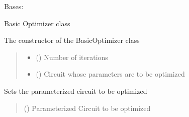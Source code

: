 \documentclass[letterpaper,10pt,english]{sphinxmanual}
\begin{document}
\begin{fulllineitems}
\label{\detokenize{qcompute_qapp.optimizer:qcompute_qapp.optimizer.BasicOptimizer}}
\pysigstartsignatures
{}
\pysigstopsignatures
\sphinxAtStartPar
Bases: 

\sphinxAtStartPar
Basic Optimizer class

\sphinxAtStartPar
The constructor of the BasicOptimizer class
\begin{quote}\begin{description}
\begin{itemize}
\item {} 
\sphinxAtStartPar
{} () \textendash{} Number of iterations

\item {} 
\sphinxAtStartPar
{} ({\hyperref[\detokenize{qcompute_qapp.circuit:qcompute_qapp.circuit.ParameterizedCircuit}]{}}) \textendash{} Circuit whose parameters are to be optimized

\end{itemize}

\end{description}\end{quote}

\begin{fulllineitems}
\label{\detokenize{qcompute_qapp.optimizer:qcompute_qapp.optimizer.BasicOptimizer.set_circuit}}
\pysigstartsignatures
{}
\pysigstopsignatures
\sphinxAtStartPar
Sets the parameterized circuit to be optimized
\begin{quote}\begin{description}
\sphinxAtStartPar
{} ({\hyperref[\detokenize{qcompute_qapp.circuit:qcompute_qapp.circuit.ParameterizedCircuit}]{}}) \textendash{} Parameterized Circuit to be optimized


\end{description}
\end{quote}
\end{fulllineitems}
\end{fulllineitems}
\end{document}
